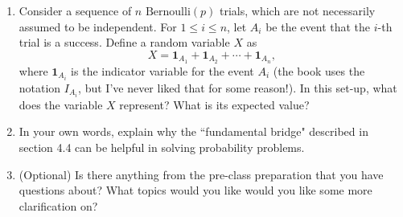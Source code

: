 \documentclass[12pt]{article}   	%
\newcommand{\bone}{\textbf{1}}
\newcommand{\soln}[2]{\vspace{0cm}}{}
\begin{document}
\begin{enumerate}
	\item Consider a sequence of $n$  $\text{Bernoulli}(p)$ trials, which are not necessarily assumed to be independent. For $1 \leq i \leq n$, let $A_{i}$ be the event that the $i$-th trial is a success. Define a random variable $X$ as 
	$$X = \bone_{A_{1}} + \bone_{A_{2}}  + \cdots + \bone_{A_{n}},$$ where $\bone_{A_{i}}$ is the indicator variable for the event $A_{i}$ (the book uses the notation $I_{A_{i}}$, but I've never liked that for some reason!). In this set-up, what does the variable $X$ represent? What is its expected value?
	
	\soln{}{$X$ represents the number of successful trials, i.e. the number of events that occurred among the $A_{i}$. By linearity of expectation and fundamental bridge, $\mathbb{E}[X] = \mathbb{E}[\bone_{A_{1}} + \cdots + \mathbb{E}[\bone_{A_{n}}] = np$}
	
	
	\item In your own words, explain why the ``fundamental bridge" described in section 4.4 can be helpful in solving probability problems.
	
	\soln{}{The fundamental bridge allows us translate between problems involving probabilities into problems about expectations. With the bonus of linearity of expectation, it may be easier to simplify certain problems, especially when counting variables.}
	\item (Optional) Is there anything from the pre-class preparation that you have questions about? What topics would you like would you like some more clarification on? 
	\end{enumerate}
\end{document}
